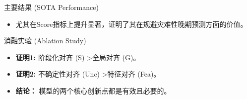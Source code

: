 \documentclass{beamer}
\begin{document}
\begin{frame}
\begin{block}{主要结果 (SOTA Performance)}
\begin{itemize}
            \item \alert{尤其在Score指标上提升显著}，证明了其在规避灾难性晚期预测方面的价值。
        \end{itemize}
    \end{block}
    \begin{block}{消融实验 (Ablation Study)}
        \begin{itemize}
            \item \textbf{证明1:} 阶段化对齐 (S) \textgreater 全局对齐 (G)。
            \item \textbf{证明2:} 不确定性对齐 (Unc) \textgreater 特征对齐 (Fea)。
            \item \textbf{结论：} 模型的两个核心创新点都是有效且必要的。
        \end{itemize}
    \end{block}
\end{frame}
\end{document}
